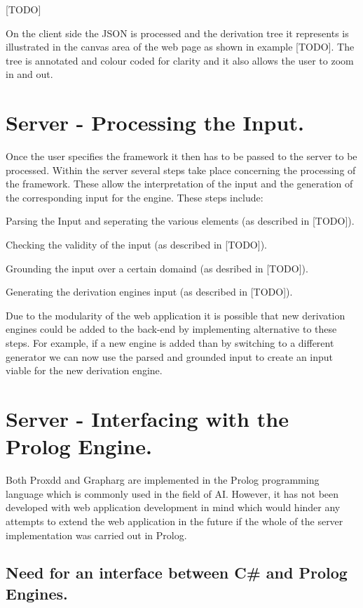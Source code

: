 [TODO]

On the client side the JSON is processed and the derivation tree it represents is illustrated in the canvas area of the web page as shown in example [TODO]. The tree is annotated and colour coded for clarity and it also allows the user to zoom in and out.

\section{Server - Processing the Input.}

Once the user specifies the framework it then has to be passed to the server to be processed. Within the server several steps take place concerning the processing of the framework. These allow the interpretation of the input and the generation of the corresponding input for the engine. These steps include:

\begin{itemize*}
\item Parsing the Input and seperating the various elements (as described in [TODO]).
\item Checking the validity of the input (as described in [TODO]).
\item Grounding the input over a certain domaind (as desribed in [TODO]).
\item Generating the derivation engines input (as described in [TODO]).
\end{itemize*}

Due to the modularity of the web application it is possible that new derivation engines could be added to the back-end by implementing alternative to these steps. For example, if a new engine is added than by switching to a different generator we can now use the parsed and grounded input to create an input viable for the new derivation engine.

\section{Server - Interfacing with the Prolog Engine.}

Both Proxdd and Grapharg are implemented in the Prolog programming language which is commonly used in the field of AI. However, it has not been developed with web application development in mind which would hinder any attempts to extend the web application in the future if the whole of the server implementation was carried out in Prolog. 

\subsection{Need for an interface between C\# and Prolog Engines.}

